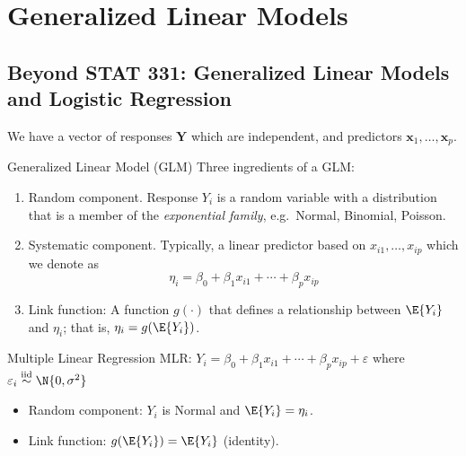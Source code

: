 \chapter{Generalized Linear Models}
\section{Beyond STAT 331:
  Generalized Linear Models and Logistic Regression}
We have a vector of responses $ \symbf{Y} $
which are independent, and predictors
$ \symbf{x}_1,\ldots,\symbf{x}_p $.
\begin{Definition}{Generalized Linear Model (GLM)}{}
    Three ingredients of a GLM\@:
    \begin{enumerate}
        \item Random component. Response $ Y_i $ is a random
              variable with a distribution that is a member of the
              \emph{exponential family}, e.g.\ Normal,
              Binomial, Poisson.
        \item Systematic component. Typically, a linear predictor
              based on $ x_{i1},\ldots,x_{ip} $ which we denote as
              \[ \eta_i=\beta_0+\beta_1x_{i1}+\cdots+\beta_p x_{i p} \]
        \item Link function: A function $ g(\cdot) $ that defines
              a relationship between $ \E{Y_i} $ and $ \eta_i $;
              that is, $ \eta_i=g(\E{Y_i}) $.
    \end{enumerate}
\end{Definition}
\begin{Example}{Multiple Linear Regression}{}
    MLR\@: $ Y_i=\beta_0+\beta_1x_{i1}+\cdots+\beta_p x_{i p}+\varepsilon $
    where $ \varepsilon_i\stackrel{\text{iid}}{\sim}\N{0,\sigma^2} $
    \begin{itemize}
        \item Random component: $ Y_i $ is Normal and $ \E{Y_i}=\eta_i $.
        \item Link function: $ g(\E{Y_i})=\E{Y_i} $ (identity).
    \end{itemize}
\end{Example}
